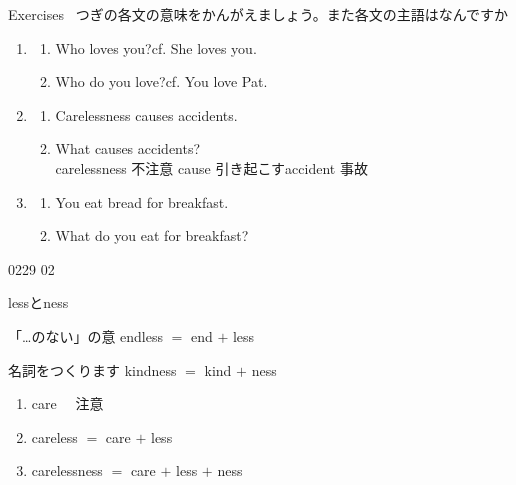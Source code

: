 \documentclass[aspectratio=169,xcolor={dvipsnames,table}]{beamer}
\begin{document}
\begin{frame}[plain]{Exercises}
\textdbend\,\,\,つぎの各文の意味をかんがえましょう。また各文の主語はなんですか

\begin{enumerate}
 \item<1-> \begin{enumerate}
		  \item Who loves you?\hfill{}cf. She loves you.
		  \item Who do you love?\hfill{}cf. You love Pat. 
		 \end{enumerate}
 \item<2-> \begin{enumerate}
	\item Carelessness causes accidents.
	\item What causes accidents?\\
\hfill{\scriptsize carelessness  不注意\hspace{10pt} cause  引き起こす\hspace{10pt}accident  事故}
       \end{enumerate}
 \item<3-> \begin{enumerate}
	\item You eat bread for breakfast.
	\item What do you eat for breakfast?
       \end{enumerate}

\end{enumerate}
\hfill{\tiny 0229}\,{\scriptsize {}\,02}

\end{frame}
\begin{frame}[plain]{lessとness}
 
\begin{description}[　　　]
 \item<2->[less] 「\ldots{}のない」の意 endless $=$ end $+$ less 
 \item<3->[ness] 名詞をつくります kindness $=$ kind $+$ ness
\end{description}

\begin{enumerate}
 \item<4-> care\,\,\,\,\,\,\,\,注意
 \item<5-> careless $=$ care $+$ less \,\,\,\,
 \item<7-> carelessness $=$ care $+$ less $+$ ness \,\,\,\,
\end{enumerate}

\end{frame}
\end{document}
